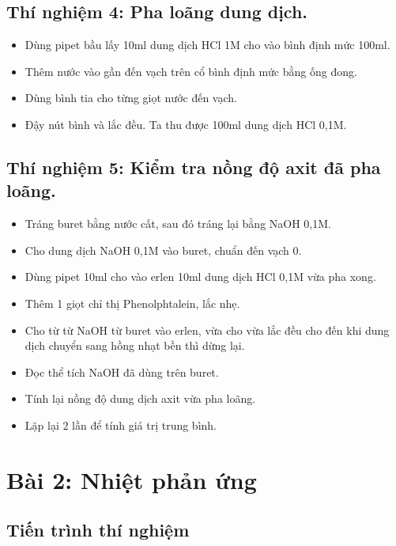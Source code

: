 \documentclass[12pt,a4paper]{report}
\begin{document}
 \subsection* {Thí nghiệm 4: Pha loãng dung dịch.}  
  
        \begin{itemize}
            \item Dùng pipet bầu lấy 10ml dung dịch HCl 1M cho vào bình định mức 100ml.
            \item Thêm nước vào gần đến vạch trên cổ bình định mức bằng ống đong.
            \item Dùng bình tia cho từng giọt nước đến vạch. 
            \item Đậy nút bình và lắc đều. Ta thu được 100ml dung dịch HCl 0,1M. 
        \end{itemize}
 \subsection* {Thí nghiệm 5: Kiểm tra nồng độ axit đã pha loãng.}  

    
        \begin{itemize}
            \item Tráng buret bằng nước cất, sau đó tráng lại bằng NaOH 0,1M. 
            \item Cho dung dịch NaOH 0,1M vào buret, chuẩn đến vạch 0. 
            \item Dùng pipet 10ml cho vào erlen 10ml dung dịch HCl 0,1M vừa pha xong.
            \item Thêm 1 giọt chỉ thị Phenolphtalein, lắc nhẹ. 
            \item Cho từ từ NaOH từ buret vào erlen, vừa cho vừa lắc đều cho đến khi dung dịch chuyển sang hồng nhạt bền thì dừng lại. 
            \item Đọc thể tích NaOH đã dùng trên buret.
            \item Tính lại nồng độ dung dịch axit vừa pha loãng. 
            \item Lặp lại 2 lần để tính giá trị trung bình.
        \end{itemize}
\newpage
\section{Bài 2: Nhiệt phản ứng}
\subsection{Tiến trình thí nghiệm}
\end{document}
